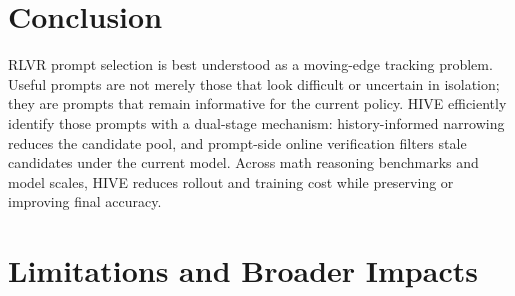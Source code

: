 \section{Conclusion}
RLVR prompt selection is best understood as a moving-edge tracking problem. Useful prompts are not merely those that look difficult or uncertain in isolation; they are prompts that remain informative for the current policy. HIVE efficiently identify those prompts with a dual-stage mechanism: history-informed narrowing reduces the candidate pool, and prompt-side online verification filters stale candidates under the current model. Across math reasoning benchmarks and model scales, HIVE reduces rollout and training cost while preserving or improving final accuracy.

\section{Limitations and Broader Impacts}
\label{sec:limitations}
